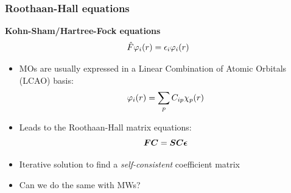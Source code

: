 \begin{frame}
  \frametitle{Roothaan-Hall equations}
  \centering
  \textbf{Kohn-Sham/Hartree-Fock equations}
  \begin{equation}
    \hat{F} \varphi_i(r) = \epsilon_i \varphi_i(r)
  \end{equation}

  \vspace{5mm}

  \begin{itemize}
    \item MOs are usually expressed in a Linear Combination of Atomic Orbitals (LCAO) basis:
        \begin{equation}
            \varphi_i(r) = \sum_p C_{ip}\chi_p(r)
        \end{equation}
    \item Leads to the Roothaan-Hall matrix equations:
        \begin{equation}
            \boldsymbol F\boldsymbol C = \boldsymbol S\boldsymbol C\boldsymbol \epsilon
        \end{equation}
    \item Iterative solution to find a \emph{self-consistent} coefficient matrix
    \vspace{5mm}
    \item Can we do the same with MWs?
  \end{itemize}
\end{frame}

